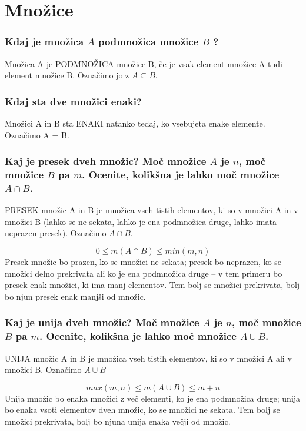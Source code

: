 \documentclass{article}
\begin{document}
\section{Množice}
\subsubsection*{Kdaj je množica $A$ podmnožica množice $B$ ?}
Množica A je PODMNOŽICA množice B, če je vsak element množice A tudi element množice B. Označimo jo z $A \subseteq B$.



\subsubsection*{Kdaj sta dve množici enaki?}
Množici A in B sta ENAKI natanko tedaj, ko vsebujeta enake elemente. Označimo A = B.


\subsubsection*{Kaj je presek dveh množic? Moč množice $A$ je $n$, moč množice $B$ pa $m$. Ocenite, kolikšna je lahko moč množice $A \cap B$.}
PRESEK množic A in B je množica vseh tistih elementov, ki so v množici A in v množici B (lahko se ne sekata, lahko je ena podmnožica druge, lahko imata neprazen presek). Označimo $A \cap B$.

\begin{equation*}
    0 \le m(A \cap B) \le min(m, n)
\end{equation*}
Presek množic bo prazen, ko se množici ne sekata; presek bo neprazen, ko se množici delno prekrivata ali ko je ena podmnožica druge – v tem primeru bo presek enak množici, ki ima manj elementov.
Tem bolj se množici prekrivata, bolj bo njun presek enak manjši od množic.

\subsubsection*{Kaj je unija dveh množic? Moč množice $A$ je $n$, moč množice $B$ pa $m$. Ocenite, kolikšna je lahko moč množice $A \cup B$.}
UNIJA množic A in B je množica vseh tistih elementov, ki so v množici A ali v množici
B. Označimo $A \cup B$

\begin{equation*}
    max(m, n) \le m(A \cup B) \le m + n
\end{equation*}
Unija množic bo enaka množici z več elementi, ko je ena podmnožica druge; unija bo enaka vsoti elementov dveh množic, ko se množici ne sekata.
Tem bolj se množici prekrivata, bolj bo njuna unija enaka večji od množic.
\end{document}
